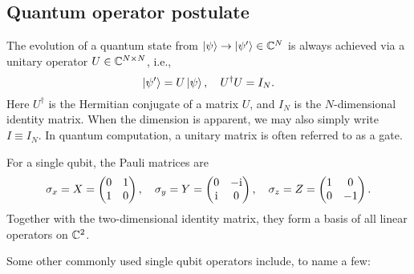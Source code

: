 \subsection{Quantum operator postulate}

The evolution of a quantum state from $\ket{\psi}\to\ket{\psi'}\in \mathbb{C}^N$ is always achieved via a unitary operator $U\in\mathbb{C}^{N\times N}$, i.e.,
\begin{equation}
\ket{\psi'}=U\ket{\psi}, \quad U^{\dag} U=I_N.
\end{equation}
Here $U^{\dag}$ is the Hermitian conjugate of a matrix $U$, and $I_N$ is the $N$-dimensional identity matrix. When the dimension is apparent, we may also simply write $I\equiv I_N$. 
In quantum computation, a unitary matrix is often referred to as a gate.

\begin{exam}
For a single qubit, the Pauli matrices are
\begin{equation}
\sigma_x=X=\begin{pmatrix}
0 & 1\\
1 & 0
\end{pmatrix}
, \quad 
\sigma_y=Y=\begin{pmatrix}
0 & -\mathrm{i}\\
\mathrm{i} & 0
\end{pmatrix}, \quad
\sigma_z=Z=\begin{pmatrix}
1 & 0\\
0 & -1
\end{pmatrix}.
\end{equation}
Together with the two-dimensional identity matrix, they form a basis of all linear operators on $\mathbb{C}^2$. 
\end{exam}

Some other commonly used single qubit operators include, to name a few:

